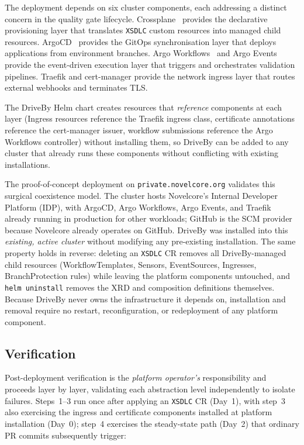 The deployment depends on six cluster components, each addressing a distinct concern in the quality gate lifecycle. Crossplane~\cite{crossplane} provides the declarative provisioning layer that translates \texttt{XSDLC} custom resources into managed child resources. ArgoCD~\cite{argocd} provides the GitOps synchronisation layer that deploys applications from environment branches. Argo Workflows~\cite{argo-workflows} and Argo Events~\cite{argo-events} provide the event-driven execution layer that triggers and orchestrates validation pipelines. Traefik and cert-manager provide the network ingress layer that routes external webhooks and terminates TLS.

The DriveBy Helm chart creates resources that \textit{reference} components at each layer (Ingress resources reference the Traefik ingress class, certificate annotations reference the cert-manager issuer, workflow submissions reference the Argo Workflows controller) without installing them, so DriveBy can be added to any cluster that already runs these components without conflicting with existing installations.

The proof-of-concept deployment on \texttt{private.novelcore.org} validates this surgical coexistence model. The cluster hosts Novelcore's Internal Developer Platform (IDP), with ArgoCD, Argo Workflows, Argo Events, and Traefik already running in production for other workloads; GitHub is the SCM provider because Novelcore already operates on GitHub. DriveBy was installed into this \textit{existing, active cluster} without modifying any pre-existing installation. The same property holds in reverse: deleting an \texttt{XSDLC} CR removes all DriveBy-managed child resources (WorkflowTemplates, Sensors, EventSources, Ingresses, BranchProtection rules) while leaving the platform components untouched, and \texttt{helm uninstall} removes the XRD and composition definitions themselves. Because DriveBy never owns the infrastructure it depends on, installation and removal require no restart, reconfiguration, or redeployment of any platform component.

\subsection{Verification}
\label{subsec:verification}

Post-deployment verification is the \textit{platform operator's} responsibility and proceeds layer by layer, validating each abstraction level independently to isolate failures. Steps~1--3 run once after applying an \texttt{XSDLC} CR (Day~1), with step~3 also exercising the ingress and certificate components installed at platform installation (Day~0); step~4 exercises the steady-state path (Day~2) that ordinary PR commits subsequently trigger:

